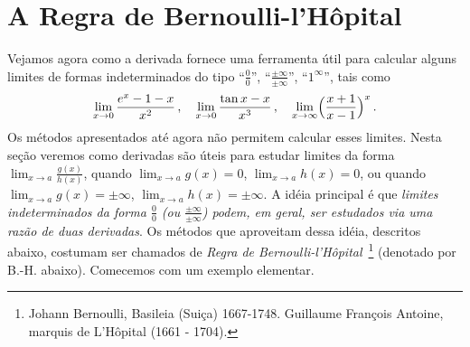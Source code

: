 \begin{exo}
\begin{sol}
\begin{center}
\begin{bmlimage}
\end{bmlimage}
\end{center}
\end{sol}
\end{exo}

\section{A Regra de Bernoulli-l'Hôpital}
%
Vejamos agora como a derivada fornece uma ferramenta útil para
calcular alguns limites 
de formas indeterminados do tipo
``$\frac00$'', ``$\frac{\pm \infty}{\pm \infty}$'', ``$1^{\infty}$'', tais como
$$
\lim_{x\to 0}\frac{e^x-1-x}{x^2}\,,\quad
\lim_{x\to 0}\frac{\tan x-x}{x^3}\,,\quad
\lim_{x\to \infty}\Bigl(\frac{x+1}{x-1}\Bigr)^x\,.
$$
Os métodos apresentados até agora não permitem calcular esses
limites.
Nesta seção veremos como derivadas são úteis para estudar limites da forma
$\lim_{x\to a}\frac{g(x)}{h(x)}$, quando $\lim_{x\to a}g(x)=0$, $\lim_{x\to
a}h(x)=0$, ou quando $\lim_{x\to a}g(x)=\pm \infty$, $\lim_{x\to
a}h(x)=\pm \infty$.
A idéia principal é que \emph{limites indeterminados da forma $\tfrac00$ (ou
$\frac{\pm \infty}{\pm \infty}$)
podem, em geral, ser estudados via uma razão de duas derivadas}. 
Os métodos que aproveitam dessa idéia,
descritos abaixo, costumam ser chamados de \emph{Regra de
Bernoulli-l'Hôpital}~\footnote{Johann Bernoulli, Basileia (Suiça) 1667-1748. 
Guillaume François Antoine, marquis de
L'Hôpital (1661 - 1704).} (denotado por B.-H. abaixo).
Comecemos com um exemplo elementar.

